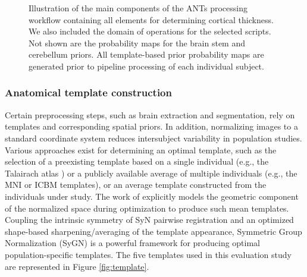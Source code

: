 \begin{figure}
  \centering
  \caption{Illustration of the main components of the ANTs processing 
  workflow containing all elements for determining cortical thickness. 
  We also included the domain of operations for the selected scripts.
  Not shown are the probability maps for the brain stem and cerebellum
  priors. All template-based prior probability maps are 
  generated prior to pipeline processing of 
  each individual subject.}
  \label{fig:pipeline}
\end{figure}

\subsubsection{Anatomical template construction}

Certain preprocessing steps, such as brain extraction and
segmentation, rely on templates and corresponding spatial priors. 
In addition, normalizing images to a standard coordinate system
reduces intersubject variability in population studies.  Various
approaches exist for determining an optimal template,
such as the selection of a preexisting template based on a single individual
(e.g., the Talairach atlas \citep{Talairach1988}) or a publicly available average of multiple individuals
(e.g., the MNI \citep{Collins1994} or ICBM \citep{Mazziotta1995}
templates), or an average template constructed from the individuals under study.
The work of \cite{avants2010} explicitly models the geometric component of the 
normalized space during optimization to produce such mean templates.  Coupling the intrinsic symmetry of 
SyN pairwise registration \citep{avants2011} and an
optimized shape-based sharpening/averaging of the template appearance, Symmetric Group Normalization (SyGN) is a powerful framework for producing optimal population-specific templates. The five templates used in this evaluation
study are represented in Figure \ref{fig:template}.


